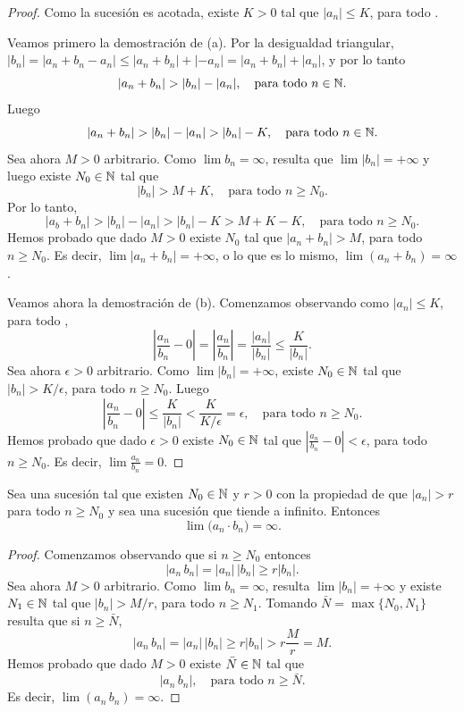 \begin{proof}
Como la sucesión \sucan es acotada, existe $K>0$ tal que $|a_n|\le K$, para todo \niN.

Veamos primero la demostración de (a).
Por la desigualdad triangular, $|b_n| = |a_n+b_n-a_n| \le |a_n+b_n| + |-a_n| = |a_n+b_n|+|a_n|$, y por lo tanto
\[
|a_n + b_n| > |b_n|-|a_n|, \quad \text{para todo {\ensuremath{n\in\mathbb{N}}}.}
\]
Luego
\[
|a_n + b_n| > |b_n|-|a_n| > |b_n| - K, \quad \text{para todo {\ensuremath{n\in\mathbb{N}}}.}
\]
Sea ahora $M>0$ arbitrario. Como $\lim b_n = \infty$, resulta que $\lim |b_n| = +\infty$ y luego existe $N_0\in\mathbb{N}$ tal que 
\[
|b_n| > M + K, \quad \text{para todo $n\ge N_0$.}
\]
Por lo tanto, 
\[
|a_b + b_n| > |b_n|-|a_n| > |b_n| - K > M+K-K ,\quad\text{para todo $n\ge N_0$}.
\]
Hemos probado que dado $M>0$ existe $N_0$ tal que $|a_n+b_n|>M$, para todo $n\ge N_0$. 
Es decir, $\lim |a_n+b_n| = +\infty$, o lo que es lo mismo, $\lim (a_n+b_n) = \infty$.

Veamos ahora la demostración de (b).
Comenzamos observando como $|a_n|\le K$, para todo \niN,
\[
\left| \frac{a_n}{b_n} - 0 \right|
= \left| \frac{a_n}{b_n} \right|
= \frac{|a_n|}{|b_n|}
\le \frac{K}{|b_n|}.
\]
Sea ahora $\epsilon >0$ arbitrario.
Como $\lim |b_n| = +\infty$, existe $N_0\in\mathbb{N}$ tal que $|b_n|>K/\epsilon$, para todo $n\ge N_0$.
Luego
\[
\left| \frac{a_n}{b_n} - 0 \right|
\le \frac{K}{|b_n|} < \frac{K}{K/\epsilon} = \epsilon,
\quad\text{para todo $n\ge N_0$}.
\]
Hemos probado que dado $\epsilon > 0$ existe $N_0\in\mathbb{N}$ tal que $\left| \frac{a_n}{b_n} - 0 \right|
<\epsilon$, para todo $n\ge N_0$. Es decir, $\lim \frac{a_n}{b_n} = 0$.
\end{proof}

\begin{proposition}\label{P:suc lim multip infinito}
    Sea \sucan una sucesión tal que existen $N_0\in\mathbb{N}$ y $r>0$ con la propiedad de que $|a_n|>r$ para todo $n\ge N_0$ y sea \sucbn una sucesión que tiende a infinito. 
    Entonces
    \[
    \lim \big( a_n \cdot b_n ) = \infty.
    \]
\end{proposition}

\begin{proof}
Comenzamos observando que si $n\ge N_0$ entonces
\[
|a_n \, b_n | = |a_n| \, |b_n|
\ge r |b_n|.
\]
Sea ahora $M>0$ arbitrario.
Como $\lim b_n = \infty$, resulta $\lim |b_n| = +\infty$ y
existe $N_1\in\mathbb{N}$ tal que $|b_n|>M/r$, para todo $n\ge N_1$.
Tomando $\bar N = \max\{ N_0, N_1 \}$ resulta que si $n\ge \bar N$, 
\[
|a_n \, b_n | = |a_n| \, |b_n|
\ge r |b_n| > r \frac Mr = M.
\]
Hemos probado que dado $M>0$ existe $\bar N\in\mathbb{N}$ tal que
\[
|a_n \, b_n |, \quad\text{para todo $n \ge \bar N$}.
\]
Es decir, $\lim (a_n\,b_n) = \infty$.
\end{proof}

